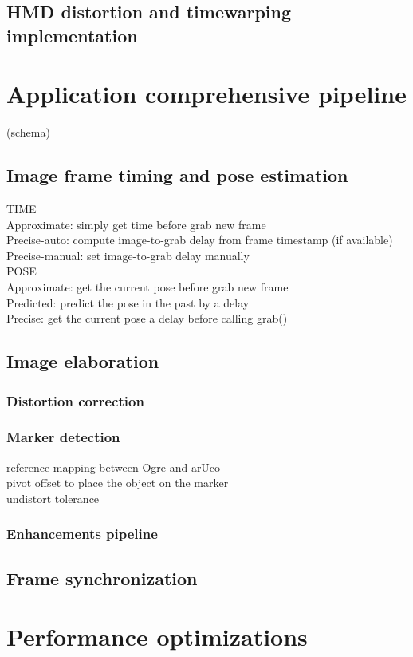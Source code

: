 \begin{itemize}
\end{itemize}

\subsection{HMD distortion and timewarping implementation}


\section{Application comprehensive pipeline}

(schema)

\subsection{Image frame timing and pose estimation}
TIME\\
Approximate: simply get time before grab new frame\\
Precise-auto: compute image-to-grab delay from frame timestamp (if available)\\
Precise-manual: set image-to-grab delay manually\\
POSE\\
Approximate: get the current pose before grab new frame\\
Predicted: predict the pose in the past by a delay\\
Precise: get the current pose a delay before calling grab()\\
\subsection{Image elaboration}

\subsubsection{Distortion correction}
\subsubsection{Marker detection}
reference mapping between Ogre and arUco\\
pivot offset to place the object on the marker\\
undistort tolerance\\

\subsubsection{Enhancements pipeline}

\subsection{Frame synchronization}

\section{Performance optimizations}
